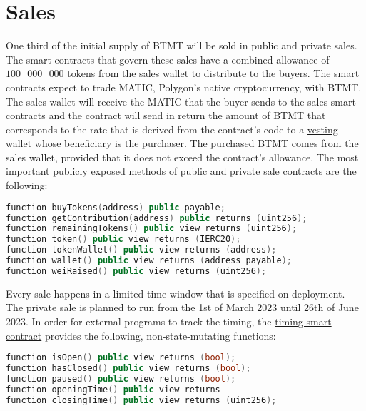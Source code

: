 \documentclass[a4paper,12pt]{article}
\begin{document}
\section{Sales}

One third of the initial supply of BTMT will be sold in public and private sales.
The smart contracts that govern these sales have a combined allowance
of $100\text{ }000\text{ }000$ tokens from the sales wallet to distribute to the buyers.
The smart contracts expect to trade MATIC, Polygon's native cryptocurrency, with BTMT.
The sales wallet will receive the MATIC that the buyer sends to the sales
smart contracts and the contract will send in return the amount of BTMT that
corresponds to the rate that is derived from the contract's code to a \href{https://github.com/OpenZeppelin/openzeppelin-contracts/blob/master/contracts/finance/VestingWallet.sol}{vesting wallet} whose beneficiary is the purchaser. The purchased BTMT comes from the sales wallet,
provided that it does not exceed the contract's allowance. The most important publicly exposed methods of public and private \href{https://github.com/UAB-BITmarkets/token/blob/master/contracts/sale/Sale.sol}{sale contracts} are the following:

\begin{lstlisting}[language=C++, caption=Solidity sale function signatures]
function buyTokens(address) public payable;
function getContribution(address) public returns (uint256);
function remainingTokens() public view returns (uint256);
function token() public view returns (IERC20);
function tokenWallet() public view returns (address);
function wallet() public view returns (address payable);
function weiRaised() public view returns (uint256);
\end{lstlisting}

Every sale happens in a limited time window that is specified on deployment.
The private sale is planned to run from the 1st of March 2023 until 26th of June 2023.
In order for external programs to track the timing, the \href{https://github.com/UAB-BITmarkets/token/blob/master/contracts/sale/TimedSale.sol}{timing smart contract} provides the following, non-state-mutating functions:
\begin{lstlisting}[language=C++, caption=Solidity timed sale function signatures]
function isOpen() public view returns (bool);
function hasClosed() public view returns (bool);
function paused() public view returns (bool);
function openingTime() public view returns
function closingTime() public view returns (uint256);
\end{lstlisting}
\end{document}
